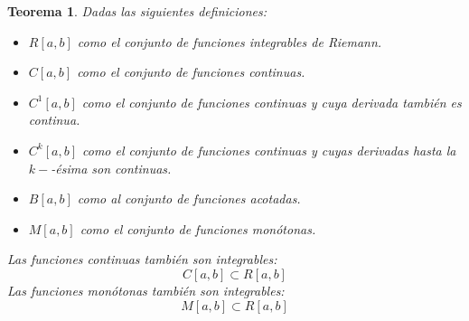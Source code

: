 \documentclass[10pt,a4paper,openright]{book}
\theoremstyle{break}
\newtheorem{theo}{Teorema}[chapter]
\begin{document}
\begin{theo}
Dadas las siguientes definiciones:
\begin{itemize}
\item $R[a,b]$ como el conjunto de funciones integrables de Riemann.
\item $C[a,b]$ como el conjunto de funciones continuas.
\item $C^{1}[a,b]$ como el conjunto de funciones continuas y cuya derivada también es continua.
\item $C^{k}[a,b]$ como el conjunto de funciones continuas y cuyas derivadas hasta la $k-$-ésima son continuas.
\item $B[a,b]$ como al conjunto de funciones acotadas.
\item $M[a,b]$ como el conjunto de funciones monótonas.
\end{itemize}
Las funciones continuas también son integrables:
$$C[a,b]\subset R[a,b]$$
Las funciones monótonas también son integrables:
$$M[a,b]\subset R[a,b]$$
\end{theo}
\end{document}
